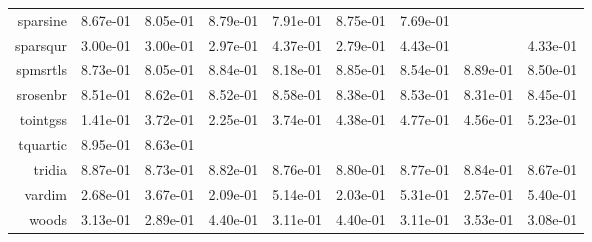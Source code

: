 \begin{tabular}{rrrrrrrrr}
  sparsine &  8.67e-01 &  8.05e-01 &  8.79e-01 &  7.91e-01 &  8.75e-01 &  7.69e-01 & \cellcolor{black}{\color{white}{ 7.91e-01}} & \cellcolor{black}{\color{white}{ 5.10e-01}} \\
  sparsqur &  3.00e-01 &  3.00e-01 &  2.97e-01 &  4.37e-01 &  2.79e-01 &  4.43e-01 & \cellcolor{black}{\color{white}{ 3.73e-01}} &  4.33e-01 \\
  spmsrtls &  8.73e-01 &  8.05e-01 &  8.84e-01 &  8.18e-01 &  8.85e-01 &  8.54e-01 &  8.89e-01 &  8.50e-01 \\
  srosenbr &  8.51e-01 &  8.62e-01 &  8.52e-01 &  8.58e-01 &  8.38e-01 &  8.53e-01 &  8.31e-01 &  8.45e-01 \\
  tointgss &  1.41e-01 &  3.72e-01 &  2.25e-01 &  3.74e-01 &  4.38e-01 &  4.77e-01 &  4.56e-01 &  5.23e-01 \\
  tquartic &  8.95e-01 &  8.63e-01 & \cellcolor{black}{\color{white}{ 8.88e-01}} & \cellcolor{black}{\color{white}{ 8.61e-01}} & \cellcolor{black}{\color{white}{ 8.91e-01}} & \cellcolor{black}{\color{white}{ 8.60e-01}} & \cellcolor{black}{\color{white}{ 8.90e-01}} & \cellcolor{black}{\color{white}{ 8.83e-01}} \\
  tridia &  8.87e-01 &  8.73e-01 &  8.82e-01 &  8.76e-01 &  8.80e-01 &  8.77e-01 &  8.84e-01 &  8.67e-01 \\
  vardim &  2.68e-01 &  3.67e-01 &  2.09e-01 &  5.14e-01 &  2.03e-01 &  5.31e-01 &  2.57e-01 &  5.40e-01 \\
  woods &  3.13e-01 &  2.89e-01 &  4.40e-01 &  3.11e-01 &  4.40e-01 &  3.11e-01 &  3.53e-01 &  3.08e-01 \\\hline
\end{tabular}
